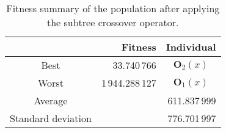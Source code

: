 \begin{table}[H]
  \centering
  \begin{tabular}{|c|r|c|}
    \hline
    	& \textbf{Fitness}	& \textbf{Individual}	\\
    \hline
    Best	& 33.740\,766	& \(\mathbf{O}_2(x)\)	\\
    Worst	& 1\,944.288\,127	& \(\mathbf{O}_1(x)\)	\\
    \hline
    \hline
    Average	& \multicolumn{2}{r|}{611.837\,999}	\\
    \hline
    Standard deviation	& \multicolumn{2}{r|}{776.701\,997}	\\
    \hline
  \end{tabular}
  \caption{Fitness summary of the population after applying the subtree crossover operator.}
  \label{tab:bg:gp:variation:cx:subtree:fitness:summary}
\end{table}